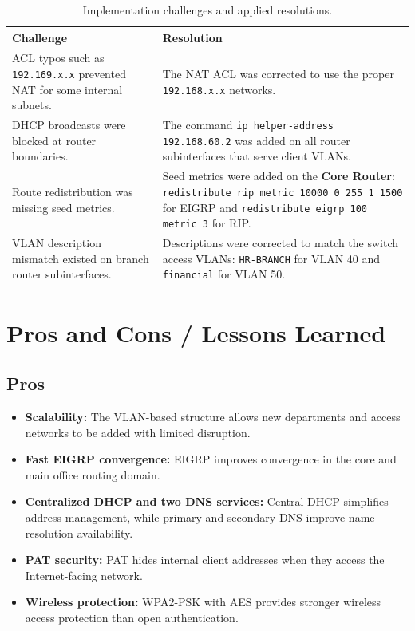 \documentclass[12pt,a4paper]{article}
\begin{document}
\begin{table}[H]
    \centering
    \footnotesize
    \caption{Implementation challenges and applied resolutions.}
    \label{tab:challenges}
    \setlength{\tabcolsep}{3pt}
    \begin{tabularx}{\textwidth}{@{}L{4.6cm}Y@{}}
        \hline
        \textbf{Challenge} & \textbf{Resolution} \\
        \hline
        ACL typos such as \texttt{192.169.x.x} prevented NAT for some internal subnets. & The NAT ACL was corrected to use the proper \texttt{192.168.x.x} networks. \\
        \hline
        DHCP broadcasts were blocked at router boundaries. & The command \texttt{ip helper-address 192.168.60.2} was added on all router subinterfaces that serve client VLANs. \\
        \hline
        Route redistribution was missing seed metrics. & Seed metrics were added on the \textbf{Core Router}: \texttt{redistribute rip metric 10000 0 255 1 1500} for EIGRP and \texttt{redistribute eigrp 100 metric 3} for RIP. \\
        \hline
        VLAN description mismatch existed on branch router subinterfaces. & Descriptions were corrected to match the switch access VLANs: \texttt{HR-BRANCH} for VLAN 40 and \texttt{financial} for VLAN 50. \\
        \hline
    \end{tabularx}
\end{table}

\section{Pros and Cons / Lessons Learned}

\subsection*{Pros}
\begin{itemize}
    \item \textbf{Scalability:} The VLAN-based structure allows new departments and access networks to be added with limited disruption.
    \item \textbf{Fast EIGRP convergence:} EIGRP improves convergence in the core and main office routing domain.
    \item \textbf{Centralized DHCP and two DNS services:} Central DHCP simplifies address management, while primary and secondary DNS improve name-resolution availability.
    \item \textbf{PAT security:} PAT hides internal client addresses when they access the Internet-facing network.
    \item \textbf{Wireless protection:} WPA2-PSK with AES provides stronger wireless access protection than open authentication.
\end{itemize}
\end{document}
